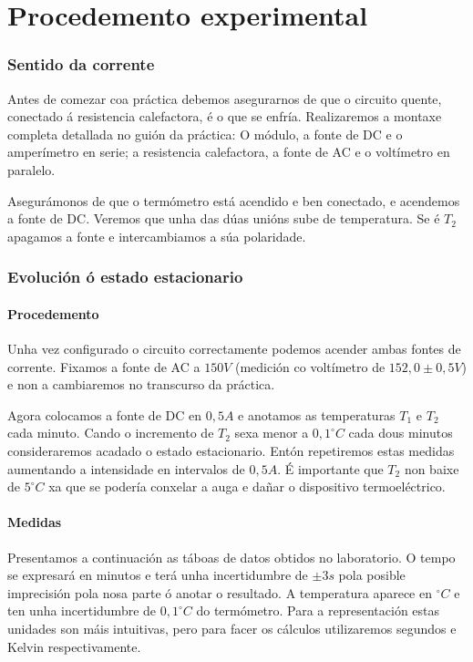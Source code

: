 \documentclass[12pt, a4paper, titlepage]{article}
\begin{document}
  \newpage
  \part{Procedemento experimental}

  \section{Sentido da corrente}

  Antes de comezar coa práctica debemos asegurarnos de que o circuito quente, conectado á resistencia calefactora, é o que se enfría.
  Realizaremos a montaxe completa detallada no guión da práctica: O módulo, a fonte de DC e o amperímetro en serie;  a resistencia calefactora, a fonte de AC e o voltímetro en paralelo.

  Asegurámonos de que o termómetro está acendido e ben conectado, e acendemos a fonte de DC. Veremos que unha das dúas unións sube de temperatura. Se é $T_2$ apagamos a fonte e intercambiamos a súa polaridade.

  \section{Evolución ó estado estacionario}

  \subsection{Procedemento}

  Unha vez configurado o circuito correctamente podemos acender ambas fontes de corrente. Fixamos a fonte de AC a $150V$ (medición co voltímetro de $152,0 \pm 0,5 V$) e non a cambiaremos no transcurso da práctica.

  Agora colocamos a fonte de DC en $0,5A$ e anotamos as temperaturas $T_1$ e $T_2$ cada minuto. Cando o incremento de $T_2$ sexa menor a $0,1 ^\circ C$ cada dous minutos consideraremos acadado o estado estacionario.
  Entón repetiremos estas medidas aumentando a intensidade en intervalos de $0,5A$. É importante que $T_2$ non baixe de $5 ^\circ C$ xa que se podería conxelar a auga e dañar o dispositivo termoeléctrico.

  \subsection{Medidas}

  Presentamos a continuación as táboas de datos obtidos no laboratorio.
  O tempo se expresará en minutos e terá unha incertidumbre de $\pm 3s$ pola posible imprecisión pola nosa parte ó anotar o resultado. A temperatura aparece en $^\circ C$ e ten unha incertidumbre de $0,1 ^\circ C$ do termómetro. Para a representación estas unidades son máis intuitivas, pero para facer os cálculos utilizaremos segundos e Kelvin respectivamente.
\end{document}
